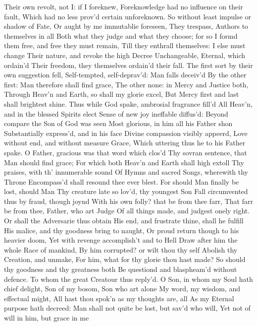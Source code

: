 \documentclass[11pt]{book}
\newcounter {first}
\newcounter {last}
\begin{document}
Their own revolt, not I: if I foreknew, 
Foreknowledge had no influence on their fault, 
Which had no less prov'd certain unforeknown. 
So without least impulse or shadow of Fate, 
Or aught by me immutablie foreseen, 
They trespass, Authors to themselves in all 
Both what they judge and what they choose; for so 
I formd them free, and free they must remain, 
Till they enthrall themselves: I else must change 
Their nature, and revoke the high Decree 
Unchangeable, Eternal, which ordain'd 
Their freedom, they themselves ordain'd their fall. 
The first sort by their own suggestion fell, 
Self-tempted, self-deprav'd: Man falls deceiv'd 
By the other first: Man therefore shall find grace, 
The other none: in Mercy and Justice both, 
Through Heav'n and Earth, so shall my glorie excel, 
But Mercy first and last shall brightest shine. 
\quad Thus while God spake, ambrosial fragrance fill'd 
All Heav'n, and in the blessed Spirits elect 
Sense of new joy ineffable diffus'd: 
Beyond compare the Son of God was seen 
Most glorious, in him all his Father shon 
Substantially express'd, and in his face 
Divine compassion visibly appeerd, 
Love without end, and without measure Grace, 
Which uttering thus he to his Father spake. 
\quad O Father, gracious was that word which clos'd 
Thy sovran sentence, that Man should find grace; 
For which both Heav'n and Earth shall high extoll 
Thy praises, with th' innumerable sound 
Of Hymns and sacred Songs, wherewith thy Throne 
Encompass'd shall resound thee ever blest. 
For should Man finally be lost, should Man 
Thy creature late so lov'd, thy youngest Son 
Fall circumvented thus by fraud, though joynd 
With his own folly? that be from thee farr, 
That farr be from thee, Father, who art Judge 
Of all things made, and judgest onely right. 
Or shall the Adversarie thus obtain 
His end, and frustrate thine, shall he fulfill 
His malice, and thy goodness bring to naught, 
Or proud return though to his heavier doom, 
Yet with revenge accomplish't and to Hell 
Draw after him the whole Race of mankind, 
By him corrupted? or wilt thou thy self 
Abolish thy Creation, and unmake, 
For him, what for thy glorie thou hast made? 
So should thy goodness and thy greatness both 
Be questiond and blaspheam'd without defence. 
\quad To whom the great Creatour thus reply'd. 
O Son, in whom my Soul hath chief delight, 
Son of my bosom, Son who art alone 
My word, my wisdom, and effectual might, 
All hast thou spok'n as my thoughts are, all 
As my Eternal purpose hath decreed: 
Man shall not quite be lost, but sav'd who will, 
Yet not of will in him, but grace in me 
\end{document}
